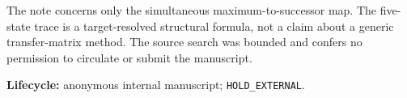 \documentclass[a4paper,10pt]{amsart}
\theoremstyle{definition}
\theoremstyle{remark}
\begin{document}
The note concerns only the simultaneous maximum-to-successor map.  The
five-state trace is a target-resolved structural formula, not a claim about a
generic transfer-matrix method.  The source search was bounded and confers no
permission to circulate or submit the manuscript.

\medskip
\noindent\textbf{Lifecycle:} anonymous internal manuscript;
\texttt{HOLD\_EXTERNAL}.

\renewcommand{\bibfont}{\small}


\end{document}
